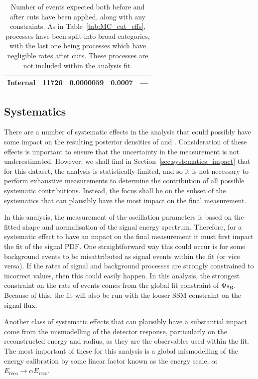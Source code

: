 \begin{table}
\begin{center}
\begin{tabulary}{\textwidth}{c R R R R}
            Internal       & \num{11726}&0.0000059& 0.0007& --- \\
            \hline
        \end{tabulary}
    \end{center}
    \caption[Number of events expected both before and after cuts have been applied, along with any constraints.]
    {Number of events expected both before and after cuts have been applied, along with any constraints. As in Table~\ref{tab:MC_cut_effs}, processes have been split into broad categories, with the last one being processes which have negligible rates after cuts. These processes are not included within the analysis fit.}
    \label{tab:MC_expected_rates_constraints}
\end{table}

\subsection{Systematics}
There are a number of systematic effects in the analysis that could possibly have some impact on the resulting posterior densities of \tonetwo{} and \dmsq{}. Consideration of these effects is important to ensure that the uncertainty in the measurement is not underestimated. However, we shall find in Section~\ref{sec:systematics_impact} that for this dataset, the analysis is statistically-limited, and so it is not necessary to perform exhaustive measurements to determine the contribution of all possible systematic contributions. Instead, the focus shall be on the subset of the systematics that can plausibly have the most impact on the final measurement.

In this analysis, the measurement of the oscillation parameters is based on the fitted shape and normalisation of the \beight{} signal energy spectrum. Therefore, for a systematic effect to have an impact on the final measurement it must first impact the fit of the signal PDF. One straightforward way this could occur is for some background events to be misattributed as signal events within the fit (or vice versa). If the rates of signal and background processes are strongly constrained to incorrect values, then this could easily happen. In this analysis, the strongest constraint on the rate of events comes from the global fit constraint of $\Phi_{\beight{}}$. Because of this, the fit will also be run with the looser SSM constraint on the signal flux.

Another class of systematic effects that can plausibly have a substantial impact come from the mismodelling of the detector response, particularly on the reconstructed energy and radius, as they are the observables used within the fit. The most important of these for this analysis is a global mismodelling of the energy calibration by some linear factor known as the energy scale, $\alpha$: $E_{\mathrm{reco}}\to\alpha E_{\mathrm{reco}}$.

